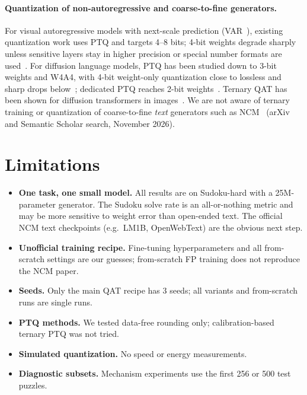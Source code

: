 \documentclass[11pt]{article}
\begin{document}
\paragraph{Quantization of non-autoregressive and coarse-to-fine generators.}
For visual autoregressive models with next-scale prediction (VAR~\citep{tian2024var}), existing quantization work
uses PTQ and targets 4--8 bits; 4-bit weights degrade sharply unless sensitive layers stay in higher precision or
special number formats are used~\citep{litevar,ptq4arvg,wei2025fpqvar,moon2026shiftsum}. For diffusion language
models, PTQ has been studied down to 3-bit weights and W4A4, with 4-bit weight-only quantization close to lossless
and sharp drops below~\citep{lin2025dllmquant}; dedicated PTQ reaches 2-bit weights~\citep{zhang2025quantdllm}.
Ternary QAT has been shown for diffusion transformers in images~\citep{lu2024terdit}. We are not aware of ternary
training or quantization of coarse-to-fine \emph{text} generators such as NCM~\citep{kumbong2026ncm} (arXiv and
Semantic Scholar search, November 2026).

\section{Limitations}

\begin{itemize}
\item \textbf{One task, one small model.} All results are on Sudoku-hard with a 25M-parameter generator. The
Sudoku solve rate is an all-or-nothing metric and may be more sensitive to weight error than open-ended text. The
official NCM text checkpoints (e.g.\ LM1B, OpenWebText) are the obvious next step.
\item \textbf{Unofficial training recipe.} Fine-tuning hyperparameters and all from-scratch settings are our
guesses; from-scratch FP training does not reproduce the NCM paper.
\item \textbf{Seeds.} Only the main QAT recipe has 3 seeds; all variants and from-scratch runs are single runs.
\item \textbf{PTQ methods.} We tested data-free rounding only; calibration-based ternary PTQ was not tried.
\item \textbf{Simulated quantization.} No speed or energy measurements.
\item \textbf{Diagnostic subsets.} Mechanism experiments use the first 256 or 500 test puzzles.
\end{itemize}
\end{document}
